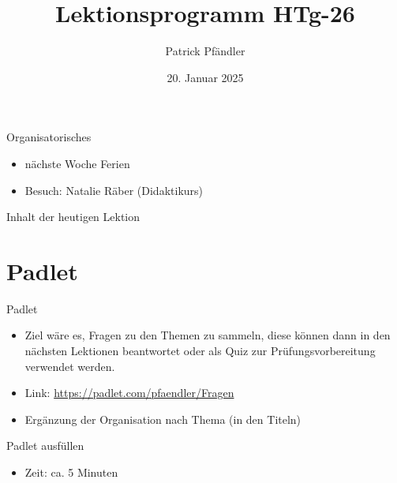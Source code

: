 



\title{\textbf{Lektionsprogramm HTg-26}}
\author{Patrick Pfändler}
\date{20. Januar 2025}




\frame{\titlepage}

\begin{frame}{Organisatorisches}
    \begin{itemize}
        \item[\textbullet] nächste Woche Ferien
        \item[\textbullet] Besuch: Natalie Räber (Didaktikurs)
    \end{itemize}

\end{frame}

\folieFragen


\begin{frame}{Inhalt der heutigen Lektion}
    \tableofcontents
\end{frame}


\section{Padlet}
\BlueSectionSlide
\begin{frame}{Padlet}
    \begin{itemize}
        \item[\textbullet] Ziel wäre es, Fragen zu den Themen zu sammeln, diese können dann in den nächsten Lektionen beantwortet oder als Quiz zur Prüfungsvorbereitung verwendet werden.
        \item[\textbullet] Link: \url{https://padlet.com/pfaendler/Fragen}
        \item[\textbullet] Ergänzung der Organisation nach Thema (in den Titeln)
    \end{itemize}
\end{frame}


\begin{frame}{Padlet ausfüllen}

    \begin{itemize}
        \item Zeit: ca. 5 Minuten
    \end{itemize}

\end{frame}


